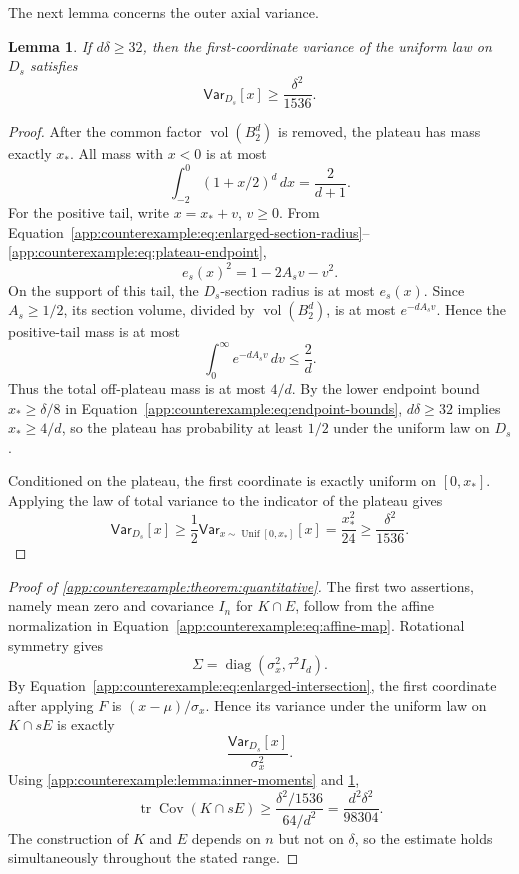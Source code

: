 \documentclass[11pt]{article}
\numberwithin{equation}{section}
\newtheorem{lemma}{Lemma}[section]
\theoremstyle{definition}
\newcommand{\V}[2]{\mathsf{Var}_{#1}\left[#2\right]}
\begin{document}
The next lemma concerns the outer axial variance.

\begin{lemma}
\label{app:counterexample:lemma:outer-axial-variance}
If $d\delta\geq 32$, then the first-coordinate variance of the uniform law on
$D_s$ satisfies
\[
  \V{D_s}{x}\geq\frac{\delta^2}{1536}.
\]
\end{lemma}

\begin{proof}
After the common factor $\operatorname{vol}(B_2^d)$ is removed, the plateau has
mass exactly
$x_*$.
All mass with $x<0$ is at most
\[
  \int_{-2}^{0}(1+x/2)^d\,dx=\frac{2}{d+1}.
\]
For the positive tail, write $x=x_*+v$,
$v\geq 0$.
From Equation~\eqref{app:counterexample:eq:enlarged-section-radius}--
\eqref{app:counterexample:eq:plateau-endpoint},
\[
  e_s(x)^2=1-2A_sv-v^2.
\]
On the support of this tail, the $D_s$-section radius is at most $e_s(x)$.
Since $A_s\geq1/2$, its section volume, divided by
$\operatorname{vol}(B_2^d)$, is at most $e^{-dA_sv}$.
Hence the positive-tail mass is at most
\[
\int_0^\infty e^{-dA_sv}\,dv\leq\frac2d.
\]
Thus the total off-plateau mass is at most $4/d$.
By the lower endpoint bound $x_*\geq\delta/8$ in
Equation~\eqref{app:counterexample:eq:endpoint-bounds},
$d\delta\geq 32$ implies
$x_*\geq 4/d$, so the plateau has probability at least
$1/2$ under the uniform law on
$D_s$.

Conditioned on the plateau, the first coordinate is exactly uniform on
$[0,x_*]$.
Applying the law of total variance to the indicator of the plateau gives
\[
\V{D_s}{x}
\geq\frac12\V{x\sim\operatorname{Unif}[0,x_*]}{x}
=\frac{x_*^2}{24}
\geq\frac{\delta^2}{1536}.
\]
\end{proof}

\begin{proof}[Proof of \cref{app:counterexample:theorem:quantitative}]
The first two assertions, namely mean zero and covariance $I_n$ for
$K\cap E$, follow from the affine normalization in
Equation~\eqref{app:counterexample:eq:affine-map}.
Rotational symmetry gives
\[
  \Sigma=\operatorname{diag}(\sigma_x^2,\tau^2 I_d).
\]
By Equation~\eqref{app:counterexample:eq:enlarged-intersection}, the first
coordinate after applying $F$ is
$(x-\mu)/\sigma_x$.
Hence its variance under the uniform law on $K\cap sE$ is exactly
\[
  \frac{\V{D_s}{x}}{\sigma_x^2}.
\]
Using \cref{app:counterexample:lemma:inner-moments} and
\cref{app:counterexample:lemma:outer-axial-variance},
\[
\operatorname{tr}\operatorname{Cov}(K\cap sE)
\geq\frac{\delta^2/1536}{64/d^2}
=\frac{d^2\delta^2}{98304}.
\]
The construction of $K$ and
$E$ depends on
$n$ but not on
$\delta$, so the estimate holds simultaneously throughout the stated range.
\end{proof}
\end{document}
